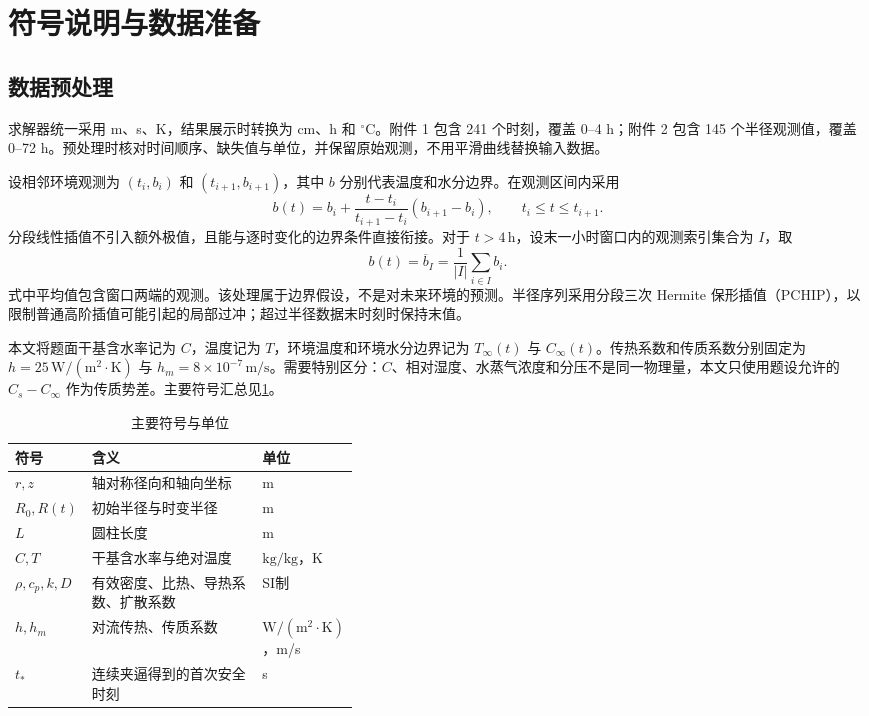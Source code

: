 \documentclass[withoutpreface,bwprint]{cumcmthesis}
\newcommand{\kgkg}{\ensuremath{\mathrm{kg/kg}}}
\newcommand{\Rtime}{R(t)}
\begin{document}
\section{符号说明与数据准备}

\subsection{数据预处理}

求解器统一采用 m、s、K，结果展示时转换为 cm、h 和 \(^{\circ}\mathrm C\)。附件 1 包含 241 个时刻，覆盖 0--4 h；附件 2 包含 145 个半径观测值，覆盖 0--72 h。预处理时核对时间顺序、缺失值与单位，并保留原始观测，不用平滑曲线替换输入数据。

设相邻环境观测为 \((t_i,b_i)\) 和 \((t_{i+1},b_{i+1})\)，其中 \(b\) 分别代表温度和水分边界。在观测区间内采用
\begin{equation}
b(t)=b_i+\frac{t-t_i}{t_{i+1}-t_i}(b_{i+1}-b_i),\qquad t_i\le t\le t_{i+1}.
\label{eq:boundary-interp}
\end{equation}
分段线性插值不引入额外极值，且能与逐时变化的边界条件直接衔接。对于 \(t>4\,\mathrm h\)，设末一小时窗口内的观测索引集合为 \(I\)，取
\begin{equation}
b(t)=\overline b_I=\frac{1}{|I|}\sum_{i\in I}b_i.
\label{eq:extension}
\end{equation}
式中平均值包含窗口两端的观测。该处理属于边界假设，不是对未来环境的预测。半径序列采用分段三次 Hermite 保形插值（PCHIP），以限制普通高阶插值可能引起的局部过冲；超过半径数据末时刻时保持末值。

本文将题面干基含水率记为 \(C\)，温度记为 \(T\)，环境温度和环境水分边界记为 \(T_\infty(t)\) 与 \(C_\infty(t)\)。传热系数和传质系数分别固定为 \(h=25\,\mathrm{W/(m^2\cdot K)}\) 与 \(h_m=8\times10^{-7}\,\mathrm{m/s}\)。需要特别区分：\(C\)、相对湿度、水蒸气浓度和分压不是同一物理量，本文只使用题设允许的 \(C_s-C_\infty\) 作为传质势差。主要符号汇总见\cref{tab:symbols}。

\begin{table}[H]
\centering
\caption{主要符号与单位}
\label{tab:symbols}
\begin{tabularx}{0.95\linewidth}{>{\centering\arraybackslash}p{0.18\linewidth}X>{\centering\arraybackslash}p{0.22\linewidth}}
\toprule
符号 & 含义 & 单位\\
\midrule
\(r,z\) & 轴对称径向和轴向坐标 & m\\
\(R_0,\Rtime\) & 初始半径与时变半径 & m\\
\(L\) & 圆柱长度 & m\\
\(C,T\) & 干基含水率与绝对温度 & \(\kgkg\)，K\\
\(\rho,c_p,k,D\) & 有效密度、比热、导热系数、扩散系数 & SI制\\
\(h,h_m\) & 对流传热、传质系数 & \(\mathrm{W/(m^2\cdot K)}\)，m/s\\
\(t_*\) & 连续夹逼得到的首次安全时刻 & s\\
\bottomrule
\end{tabularx}
\end{table}
\end{document}
